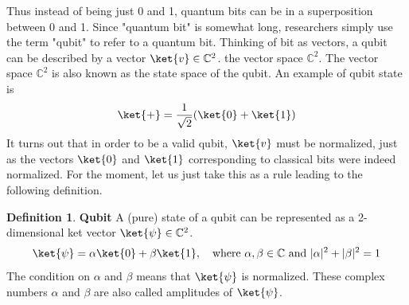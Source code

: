 \documentclass[12pt, oneside]{book}
\theoremstyle{definition}
\newtheorem{definition}{Definition}[section]
\theoremstyle{definition}
\theoremstyle{remark}
\begin{document}
Thus instead of being just 0 and 1, quantum bits can be in a superposition between 0 and 1. Since "quantum bit" is somewhat long, researchers simply use the term "qubit" to refer to a quantum bit. Thinking of bit as vectors, a qubit can be described by a vector $\ket{v} \in \mathbb{C}^2$. the vector space $\mathbb{C}^2$. The vector space $\mathbb{C}^2$ is also known as the state space of the qubit. An example of qubit state is
\[
\ket{+}=\frac{1}{\sqrt{2}}(\ket{0}+\ket{1})
\]
It turns out that in order to be a valid qubit, $\ket{v}$ must be normalized, just as the vectors $\ket{0}$ and $\ket{1}$ corresponding to classical bits were indeed normalized. For the moment, let us just take this as a rule leading to the following definition.

\begin{definition}
    \textbf{Qubit} A (pure) state of a qubit can be represented as a 2-dimensional ket vector $\ket{\psi} \in \mathbb{C}^2$.
    \[
    \ket{\psi}=\alpha\ket{0}+\beta\ket{1}, \quad \text{where $\alpha,\beta \in \mathbb{C}$ and $|\alpha|^2+|\beta|^2=1$}
    \]
    The condition on $\alpha$ and $\beta$ means that $\ket{\psi}$ is normalized. These complex numbers $\alpha$ and $\beta$ are also called amplitudes of $\ket{\psi}$.
\end{definition}
\end{document}
